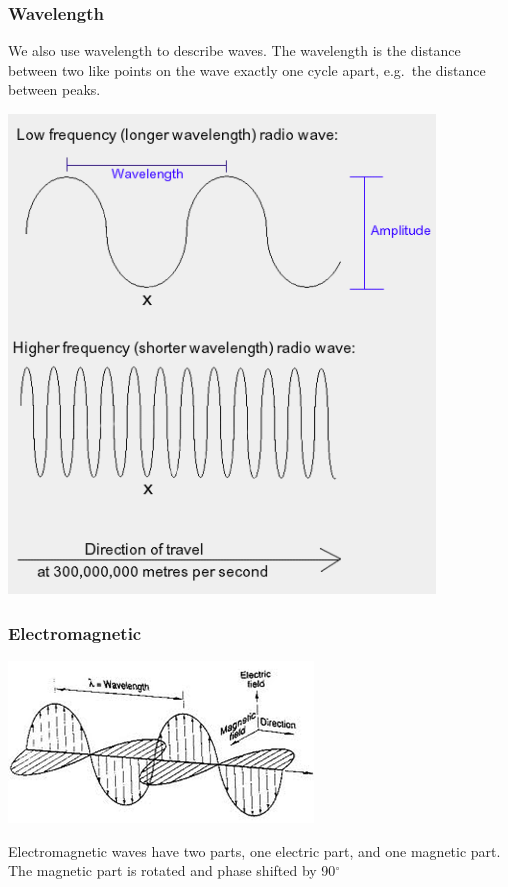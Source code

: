 \documentclass[10pt]{beamer}
\begin{document}
\begin{frame}
\frametitle{Wavelength}
We also use wavelength to describe waves. The wavelength is the distance between two like points on the wave exactly one cycle apart, e.g.\ the distance between peaks.\\
\begin{center}
\includegraphics[width=0.85\textwidth,height=0.7\textheight]{wavelength.png}
\end{center}
\end{frame}

\begin{frame}
\frametitle{Electromagnetic}
\begin{center}
\includegraphics[height=0.5\textheight]{emwave.png}\\
\end{center}
Electromagnetic waves have two parts, one electric part, and one magnetic part. The magnetic part is rotated and phase shifted by 90$^{\circ}$
\end{frame}
\end{document}
